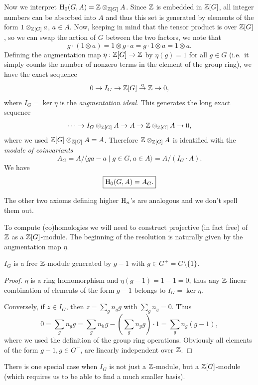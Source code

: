 Now we interpret $\mathrm{H}_0(G,A)=\mathbb{Z}\otimes_{\mathbb{Z}[G]}A$. Since $\mathbb{Z}$ is embedded in $\mathbb{Z}[G]$, all integer numbers can be absorbed into $A$  and thus this set is generated by elements of the form $1\otimes_{\mathbb{Z}[G]} a$, $a\in A$. Now, keeping in mind that the tensor product is over $\mathbb{Z}[G]$, so we can swap the action of $G$ between the two factors, we note that
\[g\cdot (1\otimes a)=1\otimes g\cdot a=g\cdot 1\otimes a=1\otimes a.\]
Defining the augmentation map $\eta:\mathbb{Z}[G]\to \mathbb{Z}$ by $\eta(g)=1$ for all $g\in G$ (i.e.~it simply counts the number of nonzero terms in the element of the group ring), we have the exact sequence
\[0\to I_G\to \mathbb{Z}[G]\overset{\eta}{\to} \mathbb{Z}\to 0,\]
where $I_G=\ker \eta$ is the \emph{augmentation ideal}. This generates the long exact sequence
\[\cdots\to I_G\otimes_{\mathbb{Z}[G]}A\to A\to \mathbb{Z}\otimes_{\mathbb{Z}[G]}A\to 0,\]
where we used $\mathbb{Z}[G]\otimes_{\mathbb{Z}[G]}A=A$. Therefore $\mathbb{Z}\otimes_{\mathbb{Z}[G]}A$ is identified with the \emph{module of coinvariants}
\[A_G=A\slash \langle ga-a\mid g\in G,a\in A\rangle=A\slash (I_G\cdot A).\]
We have
\[\boxed{\mathrm{H}_0(G,A)=A_G.}\]

The other two axioms defining higher $\mathrm{H}_n$'s are analogous and we don't spell them out.

To compute (co)homologies we will need to construct projective (in fact free) of $\mathbb{Z}$ as a $\mathbb{Z}[G]$-module. The beginning of the resolution is naturally given by the augmentation map $\eta$.

\begin{thm}
    $I_G$ is a free $\mathbb{Z}$-module generated by $g-1$ with $g\in G^+=G\setminus\{1\}$.
\end{thm}
\begin{proof}
    $\eta$ is a ring homomorphism and $\eta(g-1)=1-1=0$, thus any $\mathbb{Z}$-linear combination of elements of the form $g-1$ belongs to $I_G=\ker \eta$.

    Conversely, if $z\in I_G$, then $z=\sum_g n_g g$ with $\sum_g n_g=0$. Thus 
    \[0=\sum_g n_g g=\sum_g n_hg-\left(\sum_g n_gg\right)\cdot 1=\sum_g n_g(g-1),\]
    where we used the definition of the group ring operations. Obviously all elements of the form $g-1, g\in G^+$, are linearly independent over $\mathbb{Z}$.
\end{proof}

There is one special case when $I_G$ is not just a $\mathbb{Z}$-module, but a $\mathbb{Z}[G]$-module (which requires us to be able to find a much smaller basis).

